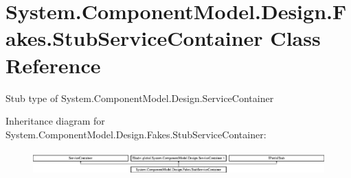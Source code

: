\hypertarget{class_system_1_1_component_model_1_1_design_1_1_fakes_1_1_stub_service_container}{\section{System.\-Component\-Model.\-Design.\-Fakes.\-Stub\-Service\-Container Class Reference}
\label{class_system_1_1_component_model_1_1_design_1_1_fakes_1_1_stub_service_container}
}


Stub type of System.\-Component\-Model.\-Design.\-Service\-Container 


Inheritance diagram for System.\-Component\-Model.\-Design.\-Fakes.\-Stub\-Service\-Container\-:\begin{figure}[H]
\begin{center}
\leavevmode
\includegraphics[height=0.938023cm]{class_system_1_1_component_model_1_1_design_1_1_fakes_1_1_stub_service_container}
\end{center}
\end{figure}
